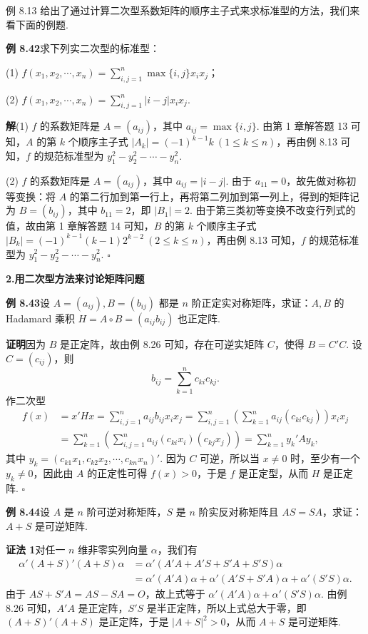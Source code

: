 \documentclass[UTF8,12pt,a4paper,fontset=fandol]{ctexart}
\begin{document}
例 8.13 给出了通过计算二次型系数矩阵的顺序主子式来求标准型的方法，我们来看下面的例题.

\noindent\textbf{例 8.42}\quad 求下列实二次型的标准型：

(1) $f(x_1,x_2,\cdots,x_n)=\displaystyle\sum_{i,j=1}^n \max\{i,j\}x_ix_j$；

(2) $f(x_1,x_2,\cdots,x_n)=\displaystyle\sum_{i,j=1}^n |i-j|x_ix_j$.

\noindent\textbf{解}\quad (1) $f$ 的系数矩阵是 $A=(a_{ij})$，其中 $a_{ij}=\max\{i,j\}$. 由第 1 章解答题 13 可知，$A$ 的第 $k$ 个顺序主子式 $|A_k|=(-1)^{k-1}k\ (1\le k\le n)$，再由例 8.13 可知，$f$ 的规范标准型为 $y_1^2-y_2^2-\cdots-y_n^2$.

(2) $f$ 的系数矩阵是 $A=(a_{ij})$，其中 $a_{ij}=|i-j|$. 由于 $a_{11}=0$，故先做对称初等变换：将 $A$ 的第二行加到第一行上，再将第二列加到第一列上，得到的矩阵记为 $B=(b_{ij})$，其中 $b_{11}=2$，即 $|B_1|=2$. 由于第三类初等变换不改变行列式的值，故由第 1 章解答题 14 可知，$B$ 的第 $k$ 个顺序主子式 $|B_k|=(-1)^{k-1}(k-1)2^{k-2}\ (2\le k\le n)$，再由例 8.13 可知，$f$ 的规范标准型为 $y_1^2-y_2^2-\cdots-y_n^2$. $\ensuremath{\square}$

\noindent\textbf{2.\quad 用二次型方法来讨论矩阵问题}

\noindent\textbf{例 8.43}\quad 设 $A=(a_{ij}),B=(b_{ij})$ 都是 $n$ 阶正定实对称矩阵，求证：$A,B$ 的 Hadamard 乘积 $H=A\circ B=(a_{ij}b_{ij})$ 也正定阵.

\noindent\textbf{证明}\quad 因为 $B$ 是正定阵，故由例 8.26 可知，存在可逆实矩阵 $C$，使得 $B=C'C$. 设 $C=(c_{ij})$，则
\[
b_{ij}=\sum_{k=1}^n c_{ki}c_{kj}.
\]
作二次型
\[
\begin{aligned}
f(x)&=x'Hx=\sum_{i,j=1}^n a_{ij}b_{ij}x_ix_j
=\sum_{i,j=1}^n\left(\sum_{k=1}^n a_{ij}(c_{ki}c_{kj})\right)x_ix_j\\
&=\sum_{k=1}^n\left(\sum_{i,j=1}^n a_{ij}(c_{ki}x_i)(c_{kj}x_j)\right)
=\sum_{k=1}^n y_k'Ay_k,
\end{aligned}
\]
其中 $y_k=(c_{k1}x_1,c_{k2}x_2,\cdots,c_{kn}x_n)'$. 因为 $C$ 可逆，所以当 $x\ne 0$ 时，至少有一个 $y_k\ne 0$，因此由 $A$ 的正定性可得 $f(x)>0$，于是 $f$ 是正定型，从而 $H$ 是正定阵. $\ensuremath{\square}$

\noindent\textbf{例 8.44}\quad 设 $A$ 是 $n$ 阶可逆对称矩阵，$S$ 是 $n$ 阶实反对称矩阵且 $AS=SA$，求证：$A+S$ 是可逆矩阵.

\noindent\textbf{证法 1}\quad 对任一 $n$ 维非零实列向量 $\alpha$，我们有
\[
\begin{aligned}
\alpha'(A+S)'(A+S)\alpha
&=\alpha'(A'A+A'S+S'A+S'S)\alpha\\
&=\alpha'(A'A)\alpha+\alpha'(A'S+S'A)\alpha+\alpha'(S'S)\alpha.
\end{aligned}
\]
由于 $AS+S'A=AS-SA=O$，故上式等于 $\alpha'(A'A)\alpha+\alpha'(S'S)\alpha$. 由例 8.26 可知，$A'A$ 是正定阵，$S'S$ 是半正定阵，所以上式总大于零，即 $(A+S)'(A+S)$ 是正定阵，于是 $|A+S|^2>0$，从而 $A+S$ 是可逆矩阵.
\end{document}
